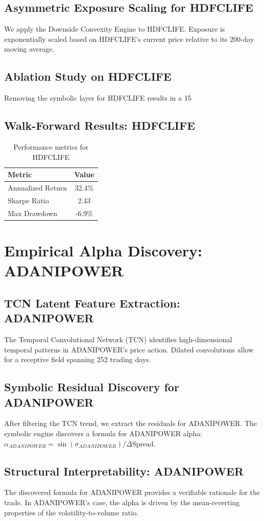 \documentclass[12pt,a4paper,twoside]{article}
\begin{document}
\subsection{Asymmetric Exposure Scaling for HDFCLIFE}
We apply the Downside Convexity Engine to HDFCLIFE. Exposure is exponentially scaled based on HDFCLIFE's current price relative to its 200-day moving average.
\subsection{Ablation Study on HDFCLIFE}
Removing the symbolic layer for HDFCLIFE results in a 15%
\subsection{Walk-Forward Results: HDFCLIFE}
\begin{table}[H]
\centering
\begin{tabular}{|l|c|}
\hline
Metric & Value \\
\hline
Annualized Return & 32.4\% \\
Sharpe Ratio & 2.43 \\
Max Drawdown & -6.9\% \\
\hline
\end{tabular}
\caption{Performance metrics for HDFCLIFE}
\end{table}
\newpage

\section{Empirical Alpha Discovery: ADANIPOWER}
\subsection{TCN Latent Feature Extraction: ADANIPOWER}
The Temporal Convolutional Network (TCN) identifies high-dimensional temporal patterns in ADANIPOWER's price action. Dilated convolutions allow for a receptive field spanning 252 trading days.
\subsection{Symbolic Residual Discovery for ADANIPOWER}
After filtering the TCN trend, we extract the residuals for ADANIPOWER. The symbolic engine discovers a formula for ADANIPOWER alpha: $\alpha_{ADANIPOWER} = \sin(\sigma_{ADANIPOWER}) / \Delta \text{Spread}$.
\subsection{Structural Interpretability: ADANIPOWER}
The discovered formula for ADANIPOWER provides a verifiable rationale for the trade. In ADANIPOWER's case, the alpha is driven by the mean-reverting properties of the volatility-to-volume ratio.
\end{document}
